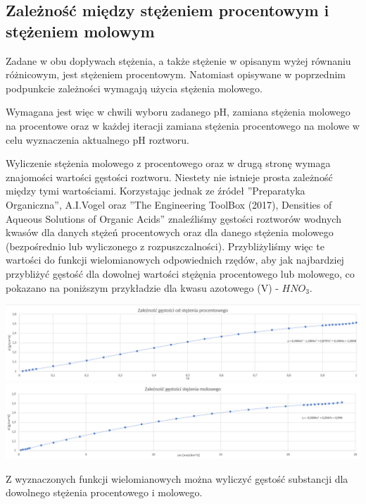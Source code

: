 \documentclass[polish,polish,a4paper,12pt]{article}
\begin{document}
	\subsection{Zależność między stężeniem procentowym i stężeniem molowym}
	
	Zadane w obu dopływach stężenia, a także stężenie w opisanym wyżej równaniu różnicowym, jest stężeniem procentowym. Natomiast opisywane w poprzednim podpunkcie zależności wymagają użycia stężenia molowego.
	
	Wymagana jest więc w chwili wyboru zadanego pH, zamiana stężenia molowego na procentowe oraz w każdej iteracji zamiana stężenia procentowego na molowe w celu wyznaczenia aktualnego pH roztworu.
	
	Wyliczenie stężenia molowego z procentowego oraz w drugą stronę wymaga znajomości wartości gęstości roztworu. Niestety nie istnieje prosta zależność między tymi wartościami. Korzystając jednak ze źródeł ''Preparatyka Organiczna'', A.I.Vogel oraz ''The Engineering \mbox{ToolBox} (2017), Densities of Aqueous Solutions of Organic Acids'' znaleźliśmy gęstości roztworów wodnych kwasów dla danych stężeń procentowych oraz dla danego stężenia molowego (bezpośrednio lub wyliczonego z rozpuszczalności). Przybliżyliśmy więc te wartości do funkcji wielomianowych odpowiednich rzędów, aby jak najbardziej przybliżyć gęstość dla dowolnej wartości stężęnia procentowego lub molowego, co pokazano na poniższym przykładzie dla kwasu azotowego (V) - $HNO_3$.
	
	\begin{center}
		\includegraphics[scale=0.45]{1}\\
		\includegraphics[scale=0.45]{2}\\
	\end{center}
	
	Z wyznaczonych funkcji wielomianowych można wyliczyć gęstość substancji dla dowolnego stężenia procentowego i molowego.
	
\end{document}
